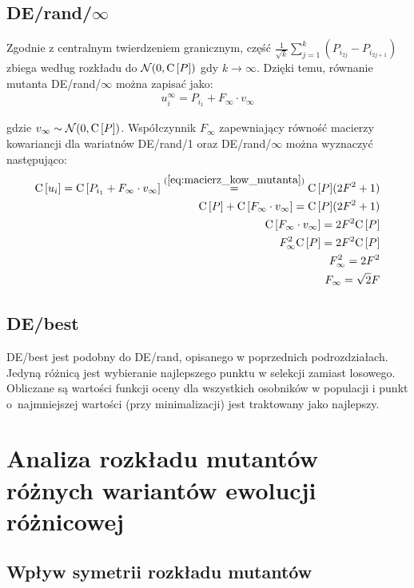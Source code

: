 \documentclass[a4paper,onecolumn,oneside,12pt,wide,floatssmall]{mwrep}
\def\C{{\rm C}\,}
\theoremstyle{definition}
\theoremstyle{plain}%
\theoremstyle{remark}
\begin{document}
\subsection{DE/rand/$\infty$}
\label{sub:de_rand_inf}

Zgodnie z centralnym twierdzeniem granicznym, część $\frac{1}{{\sqrt{k}}}\sum\limits_{j=1}^k (P_{i_{2j}} - P_{i_{2j+1}})$ 
zbiega według rozkładu do $\mathcal{N}(0, \C[P])$ gdy $k \to \infty$. 
Dzięki temu, równanie mutanta DE/rand/$\infty$ można zapisać jako:
\begin{align*}
u_i^\infty = P_{i_1} + F_\infty \cdot v_\infty
\end{align*}

gdzie $v_\infty \sim \mathcal{N}(0, \C[P])$. Współczynnik $F_\infty$ zapewniający
równość macierzy kowariancji dla wariatnów DE/rand/1 oraz DE/rand/$\infty$
można wyznaczyć następująco:
\begin{align*}
\C[u_i] = \C[P_{i_1} + F_\infty \cdot v_\infty] \overset{(\ref{eq:macierz_kow_mutanta})}{=} \C[P](2F^2 + 1) \\
\C[P] + \C[F_\infty \cdot v_\infty] = \C[P](2F^2 + 1) \\
\C[F_\infty \cdot v_\infty] = 2F^2\C[P] \\
F_\infty^2 \C[P] = 2F^2\C[P] \\
F_\infty^2 = 2F^2 \\
F_\infty = \sqrt{2}F
\end{align*}

\subsection{DE/best}

DE/best jest podobny do DE/rand, opisanego w poprzednich podrozdziałach.
Jedyną różnicą jest wybieranie najlepszego punktu w selekcji zamiast losowego. Obliczane są wartości
funkcji oceny dla wszystkich osobników w populacji i punkt o~najmniejszej wartości (przy minimalizacji)
jest traktowany jako najlepszy.

\section{Analiza rozkładu mutantów różnych wariantów ewolucji różnicowej}

\subsection{Wpływ symetrii rozkładu mutantów}
\end{document}

